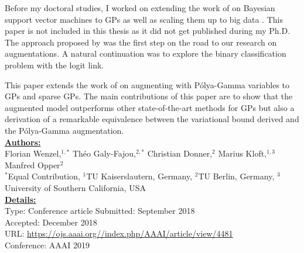 


\graphicspath{{3/figures/}}

Before my doctoral studies, I worked on extending the work of \citet{henaoBayesianNonlinearSupport2014} on Bayesian support vector machines to \acp{GP} as well as scaling them up to big data \cite{wenzel2017bayesian}.
This paper is not included in this thesis as it did not get published during my Ph.D.
The approach proposed by \citet{henaoBayesianNonlinearSupport2014} was the first step on the road to our research on augmentations.
A natural continuation was to explore the binary classification problem with the logit link.

This paper extends the work of \citet{polsonBayesianInferenceLogistic2012} on augmenting with P\'olya-Gamma variables to \acp{GP} and sparse \acp{GP}.
The main contributions of this paper are to show that the augmented model outperforms other state-of-the-art methods for \acp{GP} but also a derivation of a remarkable equivalence between the variational bound derived \citet{jaakkolaBayesianParameterEstimation2000} and the P\'olya-Gamma augmentation.\\

\textbf{\underline{Authors:}}\\
Florian Wenzel,$^{1,*}$ Th\'eo Galy-Fajou,$^{2,*}$ Christian Donner,$^{2}$ Marius Kloft,$^{1,3}$ Manfred Opper$^2$\\
\small{$^*$Equal Contribution, $^1$TU Kaiserslautern, Germany, $^2$TU Berlin, Germany, $^3$University of Southern California, USA}\\

\textbf{\underline{Details:}}\\
Type: Conference article
Submitted: September 2018\\
Accepted: December 2018\\
URL: \url{https://ojs.aaai.org//index.php/AAAI/article/view/4481}\\
Conference: AAAI 2019\\

